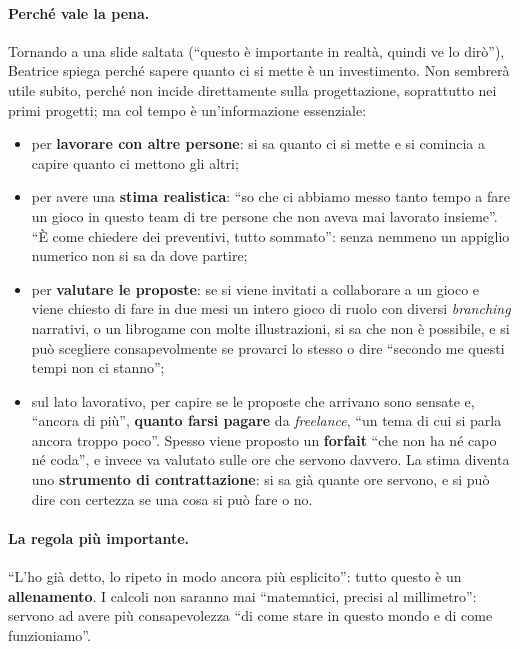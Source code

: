 \paragraph{Perché vale la pena.} Tornando a una slide saltata (``questo è importante
in realtà, quindi ve lo dirò''), Beatrice spiega perché sapere quanto ci si mette è un
investimento. Non sembrerà utile subito, perché non incide direttamente sulla
progettazione, soprattutto nei primi progetti; ma col tempo è un'informazione
essenziale:
\begin{itemize}
  \item per \textbf{lavorare con altre persone}: si sa quanto ci si mette e si
        comincia a capire quanto ci mettono gli altri;
  \item per avere una \textbf{stima realistica}: ``so che ci abbiamo messo tanto
        tempo a fare un gioco in questo team di tre persone che non aveva mai
        lavorato insieme''. ``È come chiedere dei preventivi, tutto sommato'': senza
        nemmeno un appiglio numerico non si sa da dove partire;
  \item per \textbf{valutare le proposte}: se si viene invitati a collaborare a un
        gioco e viene chiesto di fare in due mesi un intero gioco di ruolo con
        diversi \emph{branching} narrativi, o un librogame con molte illustrazioni,
        si sa che non è possibile, e si può scegliere consapevolmente se provarci lo
        stesso o dire ``secondo me questi tempi non ci stanno'';
  \item sul lato lavorativo, per capire se le proposte che arrivano sono sensate e,
        ``ancora di più'', \textbf{quanto farsi pagare} da \emph{freelance}, ``un tema
        di cui si parla ancora troppo poco''. Spesso viene proposto un
        \textbf{forfait} ``che non ha né capo né coda'', e invece va valutato sulle
        ore che servono davvero. La stima diventa uno \textbf{strumento di
        contrattazione}: si sa già quante ore servono, e si può dire con certezza se
        una cosa si può fare o no.
\end{itemize}

\paragraph{La regola più importante.} ``L'ho già detto, lo ripeto in modo ancora più
esplicito'': tutto questo è un \textbf{allenamento}. I calcoli non saranno mai
``matematici, precisi al millimetro'': servono ad avere più consapevolezza ``di come
stare in questo mondo e di come funzioniamo''.

